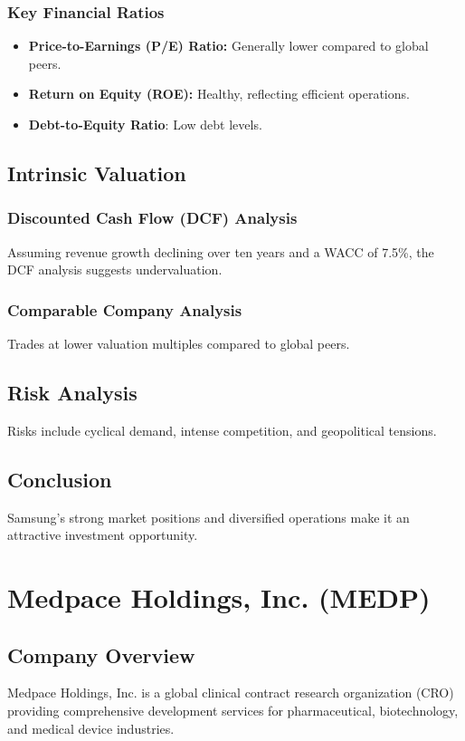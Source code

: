 \documentclass[12pt]{report}
\begin{document}
\subsection{Key Financial Ratios}
\begin{itemize}
    \item \textbf{Price-to-Earnings (P/E) Ratio:} Generally lower compared to global peers.
    \item \textbf{Return on Equity (ROE):} Healthy, reflecting efficient operations.
    \item \textbf{Debt-to-Equity Ratio}: Low debt levels.
\end{itemize}

\section{Intrinsic Valuation}
\subsection{Discounted Cash Flow (DCF) Analysis}
Assuming revenue growth declining over ten years and a WACC of 7.5\%, the DCF analysis suggests undervaluation.

\subsection{Comparable Company Analysis}
Trades at lower valuation multiples compared to global peers.

\section{Risk Analysis}
Risks include cyclical demand, intense competition, and geopolitical tensions.

\section{Conclusion}
Samsung's strong market positions and diversified operations make it an attractive investment opportunity.

\chapter{Medpace Holdings, Inc. (MEDP)}
\section{Company Overview}
Medpace Holdings, Inc. is a global clinical contract research organization (CRO) providing comprehensive development services for pharmaceutical, biotechnology, and medical device industries.
\end{document}
